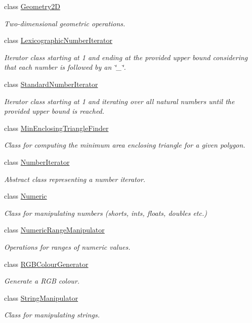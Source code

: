 \begin{DoxyCompactItemize}
class \hyperlink{classmultiscale_1_1Geometry2D}{Geometry2\-D}
\begin{DoxyCompactList}\small\item\em Two-\/dimensional geometric operations. \end{DoxyCompactList}\item 
class \hyperlink{classmultiscale_1_1LexicographicNumberIterator}{Lexicographic\-Number\-Iterator}
\begin{DoxyCompactList}\small\item\em Iterator class starting at 1 and ending at the provided upper bound considering that each number is followed by an \char`\"{}\-\_\-\char`\"{}. \end{DoxyCompactList}\item 
class \hyperlink{classmultiscale_1_1StandardNumberIterator}{Standard\-Number\-Iterator}
\begin{DoxyCompactList}\small\item\em Iterator class starting at 1 and iterating over all natural numbers until the provided upper bound is reached. \end{DoxyCompactList}\item 
class \hyperlink{classmultiscale_1_1MinEnclosingTriangleFinder}{Min\-Enclosing\-Triangle\-Finder}
\begin{DoxyCompactList}\small\item\em Class for computing the minimum area enclosing triangle for a given polygon. \end{DoxyCompactList}\item 
class \hyperlink{classmultiscale_1_1NumberIterator}{Number\-Iterator}
\begin{DoxyCompactList}\small\item\em Abstract class representing a number iterator. \end{DoxyCompactList}\item 
class \hyperlink{classmultiscale_1_1Numeric}{Numeric}
\begin{DoxyCompactList}\small\item\em Class for manipulating numbers (shorts, ints, floats, doubles etc.) \end{DoxyCompactList}\item 
class \hyperlink{classmultiscale_1_1NumericRangeManipulator}{Numeric\-Range\-Manipulator}
\begin{DoxyCompactList}\small\item\em Operations for ranges of numeric values. \end{DoxyCompactList}\item 
class \hyperlink{classmultiscale_1_1RGBColourGenerator}{R\-G\-B\-Colour\-Generator}
\begin{DoxyCompactList}\small\item\em Generate a R\-G\-B colour. \end{DoxyCompactList}\item 
class \hyperlink{classmultiscale_1_1StringManipulator}{String\-Manipulator}
\begin{DoxyCompactList}\small\item\em Class for manipulating strings. \end{DoxyCompactList}\end{DoxyCompactItemize}

